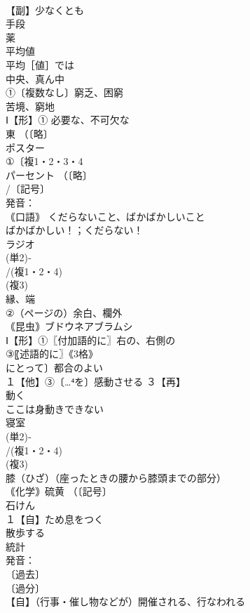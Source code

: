 \documentclass[8pt]{extreport}
\begin{document}
\begin{CJK}{UTF8}{min}
\\	【副】少なくとも 
\\	手段
\\	薬　
\\	平均値　
\\	平均［値］では 
\\	中央、真ん中
\\	①〔複数なし〕窮乏、困窮 
\\	苦境、窮地 
\\	Ⅰ【形】① 必要な、不可欠な 
\\	東 （〔略〕
\\	ポスター 
\\	①〔複1・2・3・4
\\	パーセント （〔略〕
\\	/〔記号〕
\\	発音：
\\	｟口語｠ くだらないこと、ばかばかしいこと 
\\	ばかばかしい！；くだらない！
\\	ラジオ
\\	(単2)‐
\\	/(複1・2・4)
\\	(複3)
\\	縁、端 
\\	②（ページの）余白、欄外
\\	｟昆虫｠ブドウネアブラムシ
\\	Ⅰ【形】①〖付加語的に〗右の、右側の 
\\	③〖述語的に〗《3格》
\\	にとって〕都合のよい
\\	１【他】③〔…⁴を〕感動させる ３【再】
\\	動く 
\\	ここは身動きできない
\\	寝室 
\\	(単2)‐
\\	/(複1・2・4)
\\	(複3)
\\	膝（ひざ）（座ったときの腰から膝頭までの部分） 
\\	｟化学｠硫黄 （〔記号〕
\\	石けん 
\\	１【自】ため息をつく 
\\	散歩する 
\\	統計 
\\	発音：
\\	〔過去〕
\\	〔過分〕
\\	【自】（行事・催し物などが）開催される、行なわれる 

\end{CJK}
\end{document}
